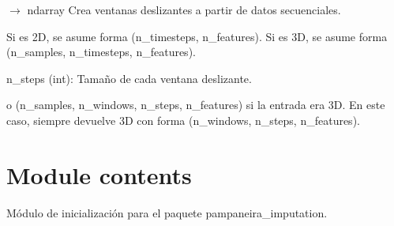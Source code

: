 \documentclass[letterpaper,10pt,english]{sphinxmanual}
\begin{document}
\begin{fulllineitems}
\label{\detokenize{pampaneira_imputation:pampaneira_imputation.utils.sliding_window}}
\pysigstartsignatures
\pysiglinewithargsret
{}
{\sphinxparamcomma {}}
{{ $\rightarrow$ ndarray}}
\pysigstopsignatures
\sphinxAtStartPar
Crea ventanas deslizantes a partir de datos secuenciales.
\begin{description}
\begin{description}
\sphinxAtStartPar
Si es 2D, se asume forma (n\_timesteps, n\_features).
Si es 3D, se asume forma (n\_samples, n\_timesteps, n\_features).

\end{description}

\sphinxAtStartPar
n\_steps (int): Tamaño de cada ventana deslizante.

\begin{description}
\begin{description}
\sphinxAtStartPar
o (n\_samples, n\_windows, n\_steps, n\_features) si la entrada era 3D.
En este caso, siempre devuelve 3D con forma (n\_windows, n\_steps, n\_features).

\end{description}

\end{description}

\end{description}

\end{fulllineitems}



\section{Module contents}
\label{\detokenize{pampaneira_imputation:module-pampaneira_imputation}}\label{\detokenize{pampaneira_imputation:module-contents}}
\sphinxAtStartPar
Módulo de inicialización para el paquete pampaneira\_imputation.
\end{document}

